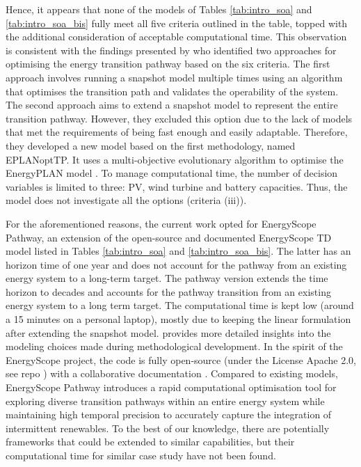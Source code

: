 
Hence, it appears that none of the models of Tables \ref{tab:intro_soa} and \ref{tab:intro_soa_bis} fully meet all five criteria outlined in the table, topped with the additional consideration of acceptable computational time. This observation is consistent with the findings presented by \citet{prina2019transition} who identified two approaches for optimising the energy transition pathway based on the six criteria. The first approach involves running a snapshot model multiple times using an algorithm that optimises the transition path and validates the operability of the system. The second approach aims to extend a snapshot model to represent the entire transition pathway. However, they excluded this option due to the lack of models that met the requirements of being fast enough and easily adaptable. 
Therefore, they developed a new model based on the first methodology, named EPLANoptTP. It uses a multi-objective evolutionary algorithm to optimise the EnergyPLAN model \cite{lundenergyplan}. To manage computational time, the number of decision variables is limited to three: \gls{PV}, wind turbine and battery capacities. Thus, the model does not investigate all the options (\ie criteria (iii)). 

For the aforementioned reasons, the current work opted for EnergyScope Pathway, an extension of the open-source and documented EnergyScope TD model \cite{limpens2019energyscope} listed in Tables \ref{tab:intro_soa} and \ref{tab:intro_soa_bis}. The latter has an horizon time of one year and does not account for the pathway from an existing energy system to a long-term target.  The pathway version extends the time horizon to decades and accounts for the pathway transition from an existing energy system to a long term target. The computational time is kept low (\ie around a 15 minutes on a personal laptop), mostly due to keeping the linear formulation after extending the snapshot model. \citet{limpens2024pathway} provides more detailed insights into the modeling choices made during methodological development.
In the spirit of the EnergyScope project, the code is fully open-source (under the License Apache 2.0, see repo \cite{PESTD_v1_repo}) with a collaborative documentation \cite{readthedocs_pathway}. Compared to existing models, EnergyScope Pathway introduces a rapid computational optimisation tool for exploring diverse transition pathways within an entire energy system while maintaining high temporal precision to accurately capture the integration of intermittent renewables. To the best of our knowledge, there are potentially frameworks that could be extended to similar capabilities, but their computational time for similar case study have not been found. 

